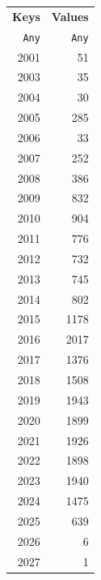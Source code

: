\begin{tabular}{rr}
  \hline
  \textbf{Keys} & \textbf{Values} \\
  \texttt{Any} & \texttt{Any} \\\hline
  2001 & 51 \\
  2003 & 35 \\
  2004 & 30 \\
  2005 & 285 \\
  2006 & 33 \\
  2007 & 252 \\
  2008 & 386 \\
  2009 & 832 \\
  2010 & 904 \\
  2011 & 776 \\
  2012 & 732 \\
  2013 & 745 \\
  2014 & 802 \\
  2015 & 1178 \\
  2016 & 2017 \\
  2017 & 1376 \\
  2018 & 1508 \\
  2019 & 1943 \\
  2020 & 1899 \\
  2021 & 1926 \\
  2022 & 1898 \\
  2023 & 1940 \\
  2024 & 1475 \\
  2025 & 639 \\
  2026 & 6 \\
  2027 & 1 \\\hline
\end{tabular}
